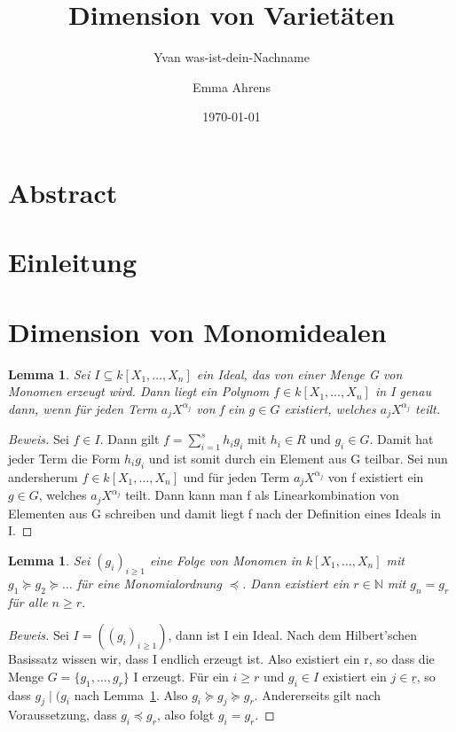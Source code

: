 \documentclass{article}
\title{Dimension von Varietäten}
\date{\today}
\author{Yvan was-ist-dein-Nachname \and Emma Ahrens}
\newtheorem{lemma}[satz]{Lemma}
\newcommand*{\R}{k[X_{1},\ldots,X_{n}]}
\begin{document}
\maketitle
\tableofcontents

\section{Abstract}
\section{Einleitung}
\section{Dimension von Monomidealen}

	\begin{lemma} \label{1.2.3}
	Sei \(I \subseteq \R\) ein Ideal, das von einer Menge G von Monomen erzeugt wird. Dann liegt
	ein Polynom \(f \in \R\) in I genau dann, wenn für jeden Term \(a_{j}X^{\alpha_{j}}\) von f ein
	\(g \in G\) existiert, welches \(a_{j}X^{\alpha_{j}}\) teilt.
	\end{lemma}

	\begin{proof}[Beweis]
	Sei \(f \in I\). Dann gilt \(f = \sum_{i=1}^{s} h_{i}g_{i}\) mit \(h_{i} \in R\) und \(g_{i}
	\in G\). Damit hat jeder Term die Form \(h_{i}g_{i}\) und ist somit durch ein Element aus G
	teilbar.
	Sei nun andersherum \(f \in \R\) und für jeden Term \(a_{j}X^{\alpha_{j}}\) von f existiert ein
	\(g \in G\), welches \(a_{j}X^{\alpha_{j}}\) teilt. Dann kann man f als Linearkombination von 
	Elementen aus G schreiben und damit liegt f nach der Definition eines Ideals in I.
	\end{proof}

	
	\begin{lemma} \label{1.2.4}
	Sei \((g_{i})_{i \geq 1}\) eine Folge von Monomen in \(\R\) mit \(g_{1} \succeq g_{2} \succeq
	\ldots\) für eine Monomialordnung \(\preceq\). Dann existiert ein \(r \in \mathbb{N}\) mit 
	\(g_{n} = g_{r}\) für alle \(n \geq r\). 
	\end{lemma}

	\begin{proof}[Beweis]
	Sei \(I = ((g_{i})_{i \geq 1})\), dann ist I ein Ideal. Nach dem Hilbert'schen Basissatz
	wissen wir, dass I endlich erzeugt ist. Also existiert ein r, so dass die Menge \(G = \{g_{1},
	\ldots, g_{r}\}\) I erzeugt. Für ein \(i \geq r\) und \(g_{i} \in I\) existiert ein
	\(j \in \underline{r}\), so dass \(g_{j}\; | \;(g_{i}\) nach Lemma~\ref{1.2.3}. Also \(g_{i}
	\succeq g_{j} \succeq g_{r}\). Andererseits gilt nach Voraussetzung, dass \(g_{i} \preceq g_{r}
	\), also folgt \(g_{i} = g_{r}\).
	\end{proof}
\end{document}
